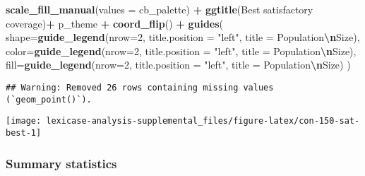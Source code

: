 \documentclass[
]{book}
\newenvironment{Shaded}{\begin{snugshade}}{\end{snugshade}}
\newcommand{\AttributeTok}[1]{\textcolor[rgb]{0.13,0.29,0.53}{#1}}
\newcommand{\DecValTok}[1]{\textcolor[rgb]{0.00,0.00,0.81}{#1}}
\newcommand{\FunctionTok}[1]{\textcolor[rgb]{0.13,0.29,0.53}{\textbf{#1}}}
\newcommand{\NormalTok}[1]{#1}
\newcommand{\SpecialCharTok}[1]{\textcolor[rgb]{0.81,0.36,0.00}{\textbf{#1}}}
\newcommand{\StringTok}[1]{\textcolor[rgb]{0.31,0.60,0.02}{#1}}
\begin{document}
\begin{Shaded}
\begin{Highlighting}[]
  \FunctionTok{scale\_fill\_manual}\NormalTok{(}\AttributeTok{values =}\NormalTok{ cb\_palette) }\SpecialCharTok{+}
  \FunctionTok{ggtitle}\NormalTok{(}\StringTok{\textquotesingle{}Best satisfactory coverage\textquotesingle{}}\NormalTok{)}\SpecialCharTok{+}
\NormalTok{  p\_theme }\SpecialCharTok{+} \FunctionTok{coord\_flip}\NormalTok{() }\SpecialCharTok{+}
  \FunctionTok{guides}\NormalTok{(}
    \AttributeTok{shape=}\FunctionTok{guide\_legend}\NormalTok{(}\AttributeTok{nrow=}\DecValTok{2}\NormalTok{, }\AttributeTok{title.position =} \StringTok{"left"}\NormalTok{, }\AttributeTok{title =} \StringTok{\textquotesingle{}Population}\SpecialCharTok{\textbackslash{}n}\StringTok{Size\textquotesingle{}}\NormalTok{),}
    \AttributeTok{color=}\FunctionTok{guide\_legend}\NormalTok{(}\AttributeTok{nrow=}\DecValTok{2}\NormalTok{, }\AttributeTok{title.position =} \StringTok{"left"}\NormalTok{, }\AttributeTok{title =} \StringTok{\textquotesingle{}Population}\SpecialCharTok{\textbackslash{}n}\StringTok{Size\textquotesingle{}}\NormalTok{),}
    \AttributeTok{fill=}\FunctionTok{guide\_legend}\NormalTok{(}\AttributeTok{nrow=}\DecValTok{2}\NormalTok{, }\AttributeTok{title.position =} \StringTok{"left"}\NormalTok{, }\AttributeTok{title =} \StringTok{\textquotesingle{}Population}\SpecialCharTok{\textbackslash{}n}\StringTok{Size\textquotesingle{}}\NormalTok{)}
\NormalTok{  )}
\end{Highlighting}
\end{Shaded}

\begin{verbatim}
## Warning: Removed 26 rows containing missing values (`geom_point()`).
\end{verbatim}

\texttt{[image: lexicase-analysis-supplemental\_files/figure-latex/con-150-sat-best-1]}

\hypertarget{summary-statistics-2}{%
\subsubsection{Summary statistics}\label{summary-statistics-2}}
\end{document}
